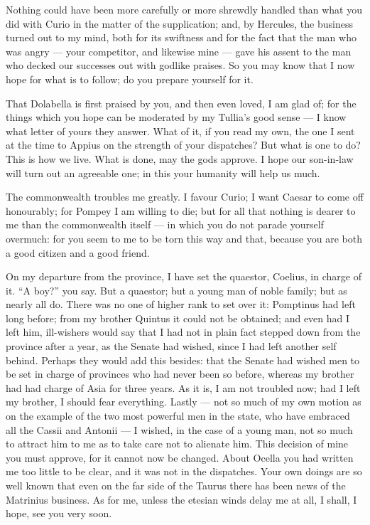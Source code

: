 

 Nothing could have been more carefully or more shrewdly handled than what you did with Curio in the matter of the supplication; and, by Hercules, the business turned out to my mind, both for its swiftness and for the fact that the man who was angry --- your competitor, and likewise mine --- gave his assent to the man who decked our successes out with godlike praises. So you may know that I now hope for what is to follow; do you prepare yourself for it.

 That Dolabella is first praised by you, and then even loved, I am glad of; for the things which you hope can be moderated by my Tullia's good sense --- I know what letter of yours they answer. What of it, if you read my own, the one I sent at the time to Appius on the strength of your dispatches? But what is one to do? This is how we live. What is done, may the gods approve. I hope our son-in-law will turn out an agreeable one; in this your humanity will help us much.

 The commonwealth troubles me greatly. I favour Curio; I want Caesar to come off honourably; for Pompey I am willing to die; but for all that nothing is dearer to me than the commonwealth itself --- in which you do not parade yourself overmuch: for you seem to me to be torn this way and that, because you are both a good citizen and a good friend.

 On my departure from the province, I have set the quaestor, Coelius, in charge of it. ``A boy?'' you say. But a quaestor; but a young man of noble family; but as nearly all do. There was no one of higher rank to set over it: Pomptinus had left long before; from my brother Quintus it could not be obtained; and even had I left him, ill-wishers would say that I had not in plain fact stepped down from the province after a year, as the Senate had wished, since I had left another self behind. Perhaps they would add this besides: that the Senate had wished men to be set in charge of provinces who had never been so before, whereas my brother had had charge of Asia for three years. As it is, I am not troubled now; had I left my brother, I should fear everything. Lastly --- not so much of my own motion as on the example of the two most powerful men in the state, who have embraced all the Cassii and Antonii --- I wished, in the case of a young man, not so much to attract him to me as to take care not to alienate him. This decision of mine you must approve, for it cannot now be changed. About Ocella you had written me too little to be clear, and it was not in the dispatches. Your own doings are so well known that even on the far side of the Taurus there has been news of the Matrinius business. As for me, unless the etesian winds delay me at all, I shall, I hope, see you very soon.
